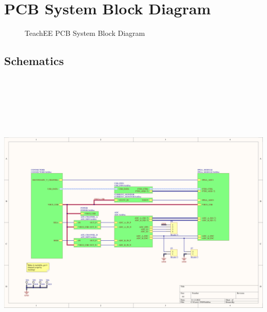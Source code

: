 \documentclass[letterpaper,12pt]{article}
\begin{document}



\newpage
\pagestyle{empty}

    \begin{appendices}
        \section{PCB System Block Diagram}
        \label{appendix:block-diagram}
        \begin{figure}[H]
            \centering
            \caption{TeachEE PCB System Block Diagram}
            \label{fig:pcb-block-diagram}
        \end{figure}
        \begin{landscape}
        \section{Schematics}
        \label{appendix:schematic}
    \centering
    \includegraphics[height=15cm]{schematics/schematic1-1.png}
        \end{landscape}
    


\end{appendices}
\end{document}
